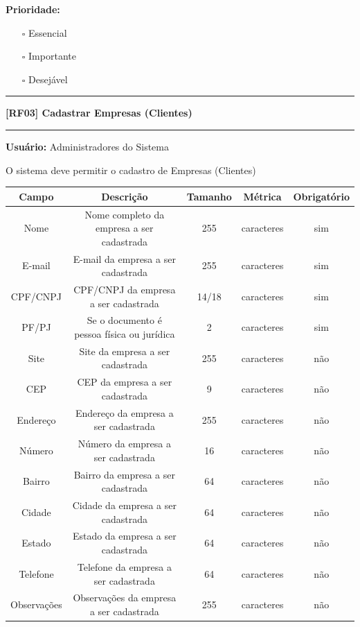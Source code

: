 	\textbf{Prioridade: }\begin{itemize}
		\item[\hspace{1cm}\rlap{\raisebox{0.2ex}{\hspace{0.4ex}\scriptsize \ding{56}}}$\square$]
		Essencial
		\item[\hspace{1cm}$\square$]
		Importante
		\item[\hspace{1cm}$\square$]
		Desejável
	\end{itemize}
	\begin{center}
		\noindent\rule{\textwidth}{0.4pt}
		\textbf{[RF03] Cadastrar Empresas (Clientes)}
		\noindent\rule{\textwidth}{0.4pt}
	\end{center}
	\textbf{Usuário:} Administradores do Sistema
	
	O sistema deve permitir o cadastro de Empresas (Clientes)
	
	\begin{center}
		\begin{adjustbox}{width=\textwidth}      \begin{tabular}{ |c|c|c|c|c| } 
				\hline
				\rowcolor{lightgray} Campo & Descrição & Tamanho & Métrica & Obrigatório \\
				\hline
				Nome & Nome completo da empresa a ser cadastrada & 255 & caracteres & sim \\ 
				\hline
				E-mail & E-mail da empresa a ser cadastrada & 255 & caracteres & sim \\ 
				\hline
				CPF/CNPJ & CPF/CNPJ da empresa a ser cadastrada & 14/18 & caracteres & sim \\ 
				\hline
				PF/PJ & Se o documento é pessoa física ou jurídica & 2 & caracteres & sim \\ 
				\hline
				Site & Site da empresa a ser cadastrada & 255 & caracteres & não \\ 
				\hline
				CEP & CEP da empresa a ser cadastrada & 9 & caracteres & não \\ 
				\hline
				Endereço & Endereço da empresa a ser cadastrada & 255 & caracteres & não \\ 
				\hline
				Número & Número da empresa a ser cadastrada & 16 & caracteres & não \\ 
				\hline
				Bairro & Bairro da empresa a ser cadastrada & 64 & caracteres & não \\ 
				\hline
				Cidade & Cidade da empresa a ser cadastrada & 64 & caracteres & não \\ 
				\hline
				Estado & Estado da empresa a ser cadastrada & 64 & caracteres & não \\ 
				\hline
				Telefone & Telefone da empresa a ser cadastrada & 64 & caracteres & não \\ 
				\hline
				Observações & Observações da empresa a ser cadastrada & 255 & caracteres & não \\
				\hline
		\end{tabular}    \end{adjustbox}
	\end{center}
	
